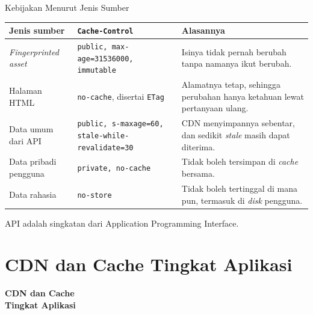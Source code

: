 \documentclass[aspectratio=169, table, 12pt]{beamer}
\begin{document}
\begin{frame}{{\Large Kebijakan Menurut Jenis Sumber}}
  \vspace{4pt}
  \centering
  {\scriptsize
  \begin{tabularx}{\textwidth}{lYY}
    \hline
    \textbf{Jenis sumber} & \textbf{\texttt{Cache-Control}} & \textbf{Alasannya} \\
    \hline
    \textit{Fingerprinted asset} & \texttt{public, max-age=31536000, immutable} & Isinya tidak pernah berubah tanpa namanya ikut berubah. \\
    \hline
    Halaman HTML & \texttt{no-cache}, disertai \texttt{ETag} & Alamatnya tetap, sehingga perubahan hanya ketahuan lewat pertanyaan ulang. \\
    \hline
    Data umum dari API & \texttt{public, s-maxage=60, stale-while-revalidate=30} & CDN menyimpannya sebentar, dan sedikit \textit{stale} masih dapat diterima. \\
    \hline
    Data pribadi pengguna & \texttt{private, no-cache} & Tidak boleh tersimpan di \textit{cache} bersama. \\
    \hline
    Data rahasia & \texttt{no-store} & Tidak boleh tertinggal di mana pun, termasuk di \textit{disk} pengguna. \\
    \hline
  \end{tabularx}}

  \vspace{6pt}
  {\footnotesize API adalah singkatan dari Application Programming Interface.}
\end{frame}

\section{CDN dan Cache Tingkat Aplikasi}

\begin{frame}{\hfill}
  \centering
  \Huge{\textbf{CDN dan Cache\\Tingkat Aplikasi}}
\end{frame}
\end{document}
